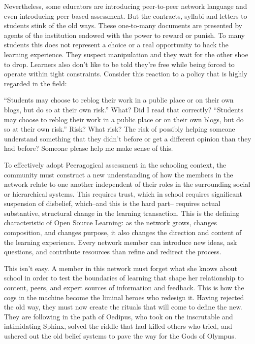 Nevertheless, some educators are introducing peer-to-peer network
language and even introducing peer-based assessment. But the contracts,
syllabi and letters to students stink of the old ways. These one-to-many
documents are presented by agents of the institution endowed with the
power to reward or punish. To many students this does not represent a
choice or a real opportunity to hack the learning experience. They
suspect manipulation and they wait for the other shoe to drop. Learners
also don't like to be told they're free while being forced to operate
within tight constraints. Consider this reaction to a policy that is
highly regarded in the field:

``Students may choose to reblog their work in a public place or on their
own blogs, but do so at their own risk.'' What? Did I read that
correctly? ``Students may choose to reblog their work in a public place
or on their own blogs, but do so at their own risk.'' Risk? What risk?
The risk of possibly helping someone understand something that they
didn't before or get a different opinion than they had before? Someone
please help me make sense of this.

To effectively adopt Peeragogical assessment in the schooling context,
the community must construct a new understanding of how the members in
the network relate to one another independent of their roles in the
surrounding social or hierarchical systems. This requires trust, which
in school requires significant suspension of disbelief, which--and this
is the hard part-- requires actual substantive, structural change in the
learning transaction. This is the defining characteristic of Open Source
Learning: as the network grows, changes composition, and changes
purpose, it also changes the direction and content of the learning
experience. Every network member can introduce new ideas, ask questions,
and contribute resources than refine and redirect the process.

This isn't easy. A member in this network must forget what she knows
about school in order to test the boundaries of learning that shape her
relationship to content, peers, and expert sources of information and
feedback. This is how the cogs in the machine become the liminal heroes
who redesign it. Having rejected the old way, they must now create the
rituals that will come to define the new. They are following in the path
of Oedipus, who took on the inscrutable and intimidating Sphinx, solved
the riddle that had killed others who tried, and ushered out the old
belief systems to pave the way for the Gods of Olympus.

